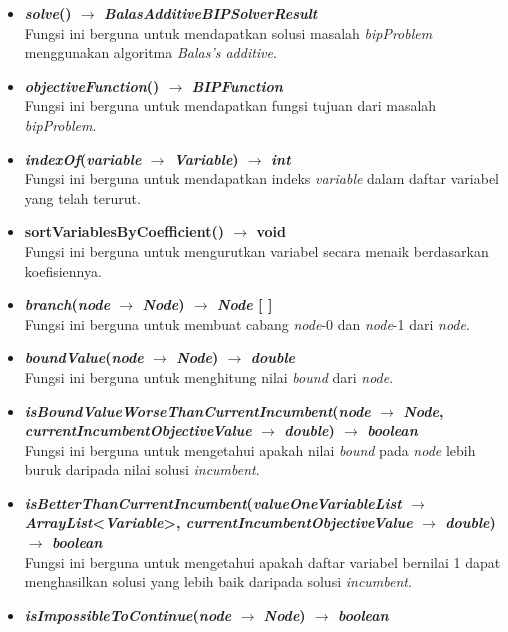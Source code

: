 \begin{itemize}
	\item \textbf{\textit{solve}() $\rightarrow$ \textit{BalasAdditiveBIPSolverResult}}\\
	Fungsi ini berguna untuk mendapatkan solusi masalah \textit{bipProblem} menggunakan algoritma \textit{Balas's additive}.
	\item \textbf{\textit{objectiveFunction}() $\rightarrow$ \textit{BIPFunction}}\\
	Fungsi ini berguna untuk mendapatkan fungsi tujuan dari masalah \textit{bipProblem}.
	\item \textbf{\textit{indexOf}(\textit{variable} $\rightarrow$ \textit{Variable}) $\rightarrow$ \textit{int}}\\
	Fungsi ini berguna untuk mendapatkan indeks \textit{variable} dalam daftar variabel yang telah terurut.
	\item \textbf{\textbf{sortVariablesByCoefficient}() $\rightarrow$ \textbf{void}}\\
	Fungsi ini berguna untuk mengurutkan variabel secara menaik berdasarkan koefisiennya.
	\item \textbf{\textit{branch}(\textit{node} $\rightarrow$ \textit{Node}) $\rightarrow$ \textit{Node} [ ]}\\
	Fungsi ini berguna untuk membuat cabang \textit{node}-0 dan \textit{node}-1 dari \textit{node}.
	\item \textbf{\textit{boundValue}(\textit{node} $\rightarrow$ \textit{Node}) $\rightarrow$ \textit{double}}\\
	Fungsi ini berguna untuk menghitung nilai \textit{bound} dari \textit{node}.
	\item \textbf{\textit{isBoundValueWorseThanCurrentIncumbent}(\textit{node} $\rightarrow$ \textit{Node}, \textit{currentIncumbentObjectiveValue} $\rightarrow$ \textit{double}) $\rightarrow$ \textit{boolean}}\\
	Fungsi ini berguna untuk mengetahui apakah nilai \textit{bound} pada \textit{node} lebih buruk daripada nilai solusi \textit{incumbent}.
	\item \textbf{\textit{isBetterThanCurrentIncumbent}(\textit{valueOneVariableList} $\rightarrow$ \textit{ArrayList}<\textit{Variable}>, \textit{currentIncumbentObjectiveValue} $\rightarrow$ \textit{double}) $\rightarrow$ \textit{boolean}}\\
	Fungsi ini berguna untuk mengetahui apakah daftar variabel bernilai 1 dapat menghasilkan solusi yang lebih baik daripada solusi \textit{incumbent}.
	\item \textbf{\textit{isImpossibleToContinue}(\textit{node} $\rightarrow$ \textit{Node}) $\rightarrow$ \textit{boolean}}\\

\end{itemize}

